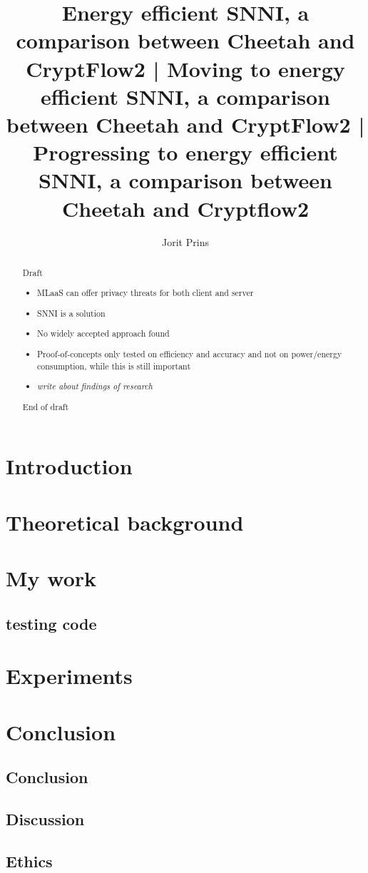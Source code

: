 \documentclass[twoside]{Style/uva-inf-bachelor-thesis}
\title{Energy efficient SNNI, a comparison between Cheetah and CryptFlow2 | Moving to energy efficient SNNI, a comparison between Cheetah and CryptFlow2 | Progressing to energy efficient SNNI, a comparison between Cheetah and Cryptflow2}
\author{Jorit Prins}
\begin{document}
\maketitle

\begin{abstract}
\color{red}\noident Draft\color{red}
\begin{itemize}
    \item MLaaS can offer privacy threats for both client and server
    \item SNNI is a solution
    \item No widely accepted approach found
    \item Proof-of-concepts only tested on efficiency and accuracy and not on power/energy consumption, while this is still important
    \item \textit{write about findings of research}
\end{itemize}
\color{red}End of draft\color{red}

\end{abstract}

\tableofcontents

\chapter{Introduction}\label{chap:introduction}


\chapter{Theoretical background}\label{chap:theoreticalbackground}


\chapter{My work}\label{chap:mywork}
\section{testing code}

\chapter{Experiments}\label{chap:experiments}

% 


\chapter{Conclusion}\label{chap:conclusion}
\section{Conclusion}
\section{Discussion}
\section{Ethics}


\printbibliography
\end{document}
